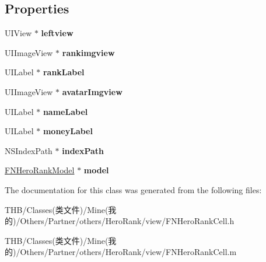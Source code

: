 \subsection*{Properties}
\begin{DoxyCompactItemize}
\item 
\mbox{\label{interface_f_n_hero_rank_cell_aae3f88bfc2ed7d840be36c389ff45145}} 
U\+I\+View $\ast$ {\bfseries leftview}
\item 
\mbox{\label{interface_f_n_hero_rank_cell_abbd6e1bbcf1109e1a747a006222e0da1}} 
U\+I\+Image\+View $\ast$ {\bfseries rankimgview}
\item 
\mbox{\label{interface_f_n_hero_rank_cell_a16009c0cd273676f801d4ba9d2cbf346}} 
U\+I\+Label $\ast$ {\bfseries rank\+Label}
\item 
\mbox{\label{interface_f_n_hero_rank_cell_a156cc83e36edbe49b17f56099fb6773b}} 
U\+I\+Image\+View $\ast$ {\bfseries avatar\+Imgview}
\item 
\mbox{\label{interface_f_n_hero_rank_cell_a4f4e3d20ac827cedfa5e7e4585c03497}} 
U\+I\+Label $\ast$ {\bfseries name\+Label}
\item 
\mbox{\label{interface_f_n_hero_rank_cell_a12b6fc7a3d7c11bd754de7833a95a390}} 
U\+I\+Label $\ast$ {\bfseries money\+Label}
\item 
\mbox{\label{interface_f_n_hero_rank_cell_aafa0660d4c08ea2aa0f2d5184acec2a3}} 
N\+S\+Index\+Path $\ast$ {\bfseries index\+Path}
\item 
\mbox{\label{interface_f_n_hero_rank_cell_a1de2beda3cebed98196453a0a3f48df5}} 
\mbox{\hyperlink{interface_f_n_hero_rank_model}{F\+N\+Hero\+Rank\+Model}} $\ast$ {\bfseries model}
\end{DoxyCompactItemize}


The documentation for this class was generated from the following files\+:\begin{DoxyCompactItemize}
\item 
T\+H\+B/\+Classes(类文件)/\+Mine(我的)/\+Others/\+Partner/others/\+Hero\+Rank/view/F\+N\+Hero\+Rank\+Cell.\+h\item 
T\+H\+B/\+Classes(类文件)/\+Mine(我的)/\+Others/\+Partner/others/\+Hero\+Rank/view/F\+N\+Hero\+Rank\+Cell.\+m\end{DoxyCompactItemize}
